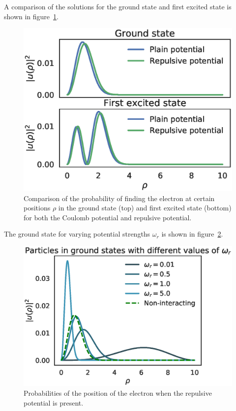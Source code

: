 \documentclass[aps,reprint]{revtex4-1}
\begin{document}
A comparison of the solutions for the ground state and first excited state is
shown in figure~\ref{fig:excitation}.

\begin{figure}[H]
  \centering
  \includegraphics[width=\columnwidth]{figures/excitation.eps}
  \caption{\label{fig:excitation} Comparison of the probability of finding the
    electron at certain positions \(\rho\) in the ground state (top) and first
    excited state (bottom) for both the Coulomb potential and repulsive potential.}
\end{figure}

The ground state for varying potential strengths $\omega_r$ is shown in figure~\ref{fig:omegas}.

\begin{figure}[H]
  \centering
  \includegraphics[width=\columnwidth]{figures/omegas.eps}
  \caption{\label{fig:omegas} Probabilities of the position of the electron when
  the repulsive potential is present.}
\end{figure}
\end{document}

